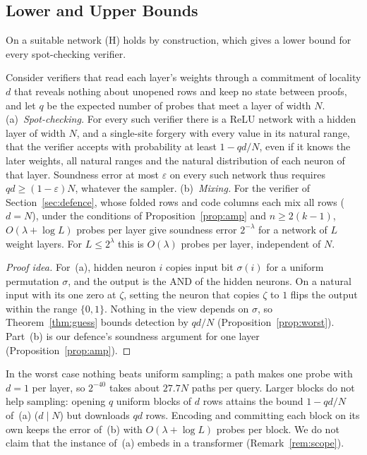 \subsection{Lower and Upper Bounds}
\label{sec:dichotomy}

On a suitable network (H) holds by construction, which gives a lower bound for every
spot-checking verifier.

\begin{theorem}
\label{thm:dich}
Consider verifiers that read each layer's weights through a commitment of locality $d$ that
reveals nothing about unopened rows and keep no state between proofs, and let $q$ be the expected
number of probes that meet a layer of width $N$.
(a)~\emph{Spot-checking.} For every such verifier there is a ReLU network with a hidden layer of
width $N$, and a single-site forgery with every value in its natural range, that the verifier
accepts with probability at least $1-qd/N$, even if it knows the later weights, all natural
ranges and the natural distribution of each neuron of that layer. Soundness error at most
$\varepsilon$ on every such
network thus requires $qd\ge(1-\varepsilon)N$, whatever the sampler.
(b)~\emph{Mixing.} For the verifier of Section~\ref{sec:defence}, whose folded rows and code columns
each mix all rows ($d=N$), under the conditions of Proposition~\ref{prop:amp} and $n\ge2(k-1)$,
$O(\lambda+\log L)$ probes per layer give soundness error $2^{-\lambda}$ for a network of $L$
weight layers. For $L\le2^{\lambda}$ this is $O(\lambda)$ probes per layer, independent of $N$.
\end{theorem}

\begin{proof}[Proof idea]
For~(a), hidden neuron $i$ copies input bit $\sigma(i)$ for a uniform permutation $\sigma$, and
the output is the AND of the hidden neurons. On a natural input with its one zero at $\zeta$,
setting the neuron that copies $\zeta$ to $1$ flips the output within the range $\{0,1\}$. Nothing in
the view depends on $\sigma$, so Theorem~\ref{thm:guess} bounds detection by $qd/N$
(Proposition~\ref{prop:worst}). Part~(b) is our defence's soundness argument for one layer
(Proposition~\ref{prop:amp}).
\end{proof}

 In the worst case nothing beats uniform sampling; a path makes one
probe with $d=1$ per layer, so $2^{-40}$ takes about $27.7N$ paths per query. Larger blocks do
not help sampling: opening $q$ uniform blocks of $d$ rows attains the bound $1-qd/N$ of~(a)
($d\mid N$) but downloads $qd$ rows. Encoding and committing each block on its own keeps the
error of~(b) with $O(\lambda+\log L)$ probes per block. We do not claim that
the instance of~(a) embeds in a transformer (Remark~\ref{rem:scope}).

